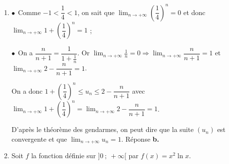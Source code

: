 \begin{enumerate}
$b_{n+1} = a_{n+1} - 2 = 0,5a_n + 1 - 2 = 0,5a_n - 1 = 0,5\left(a_n - 2 \right) = 0,5b_n$.

L'égalité $b_{n+1} = 0,5b_n$ montre que la suite $\left(b_n\right)$ est une suite géométrique de raison 0,5. 

\hfill Réponse \textbf{d.}

\item %


%
$\bullet~~$Comme $- 1 < \dfrac{1}{4} < 1$, on sait que $\displaystyle\lim_{n \to + \infty}\left(\dfrac14\right)^n = 0$ et donc $\displaystyle\lim_{n \to + \infty}1 + \left(\dfrac14\right)^n = 1$ ;

$\bullet~~$On a $\dfrac{n}{n + 1} = \dfrac{1}{1 + \frac1 n}$.
Or $\displaystyle\lim_{n \to + \infty} \frac1 n = 0 \Rightarrow \displaystyle\lim_{n \to + \infty} \dfrac{n}{n + 1} = 1$ et $\displaystyle\lim_{n \to + \infty}2 - \dfrac{n}{n + 1} = 1$.


On a donc  $1  + \left(\dfrac14\right)^n \leqslant u_n \leqslant 2 - \dfrac{n}{n+1}$ avec  $\displaystyle\lim_{n \to + \infty}1 + \left(\dfrac14\right)^n = \displaystyle\lim_{n \to + \infty}2 - \dfrac{n}{n + 1} = 1$. 

D'après le théorème des gendarmes, on peut dire que la suite $(u_n)$ est convergente et que $\displaystyle\lim_{n \to + \infty} u_n=1$.\hfill
Réponse \textbf{b.}

\item Soit $f$ la fonction définie sur $]0~;~+\infty[$ par $f(x) = x^2 \ln x$.




\end{enumerate}
